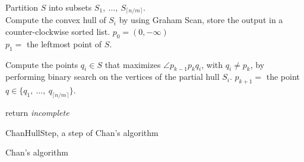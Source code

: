 \documentclass[
12pt,
a4paper,
oneside,
headinclude,
footinclude]{report}
\theoremstyle{definition} %
\begin{document}
\begin{algorithm}[H]
	\DontPrintSemicolon
	\SetAlgoVlined
	Partition $S$ into subsets $S_1,\ \ldots,\ S_{\lceil n/m \rceil}$.\\
	{
		Compute the convex hull of $S_i$ by using Graham Scan, store the output in a counter-clockwise sorted list.
	}  
	$p_0 = (0, -\infty)$\\
	$p_1 =$ the leftmost point of $S$.
	
	{
		{
			Compute the points $q_i \in S$ that maximizes $\angle p_{k-1}p_kq_i$, with $q_i \ne p_k$, by performing binary search on the vertices of the partial hull $S_i$.
		}
		$p_{k+1} = $ the point $q \in \{q_1,\ \ldots,\ q_{\lceil n/m \rceil}\}$.\\
	}
	
	return \textit{incomplete}
	\caption{ChanHullStep, a step of Chan's algorithm}
\end{algorithm}

\begin{algorithm}[H]
	\DontPrintSemicolon
	\SetAlgoVlined
	\caption{Chan's algorithm}
\end{algorithm}
\end{document}
